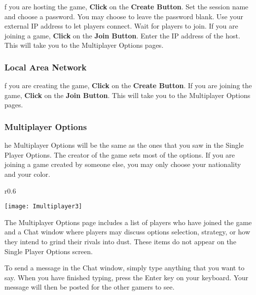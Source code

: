 f you are hosting the game, \textbf{Click} on the \textbf{Create Button}. Set the session name and choose a password. You may choose to leave the password blank. Use your external IP address to let players connect. Wait for players to join. If you are joining a game, \textbf{Click} on the \textbf{Join Button}. Enter the IP address of the host. This will take you to the Multiplayer Options pages.

\subsubsection{Local Area Network}

f you are creating the game, \textbf{Click} on the \textbf{Create Button}. If you are joining the game, \textbf{Click} on the \textbf{Join Button}. This will take you to the Multiplayer Options pages.

\subsubsection{Multiplayer Options}

he Multiplayer Options will be the same as the ones that you saw in the Single Player Options. The creator of the game sets most of the options. If you are joining a game created by someone else, you may only choose your nationality and your color.

\begin{wrapfigure}{r}{0.6\textwidth}
    \begin{center}
        \vspace{-20pt}
        \texttt{[image: Imultiplayer3]} %
    \end{center}
    \vspace{-20pt}
\end{wrapfigure}

The Multiplayer Options page includes a list of players who have joined the game and a Chat window where players may discuss options selection, strategy, or how they intend to grind their rivals into dust. These items do not appear on the Single Player Options screen.


To send a message in the Chat window, simply type anything that you want to say. When you have finished typing, press the Enter key on your keyboard. Your message will then be posted for the other gamers to see.

